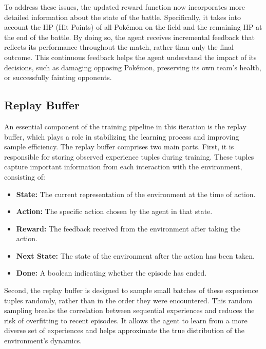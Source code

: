 To address these issues, the updated reward function now incorporates more detailed information about the 
state of the battle. Specifically, it takes into account the HP (Hit Points) of all Pokémon on the field 
and the remaining HP at the end of the battle. By doing so, the agent receives incremental feedback that 
reflects its performance throughout the match, rather than only the final outcome. This continuous feedback 
helps the agent understand the impact of its decisions, such as damaging opposing Pokémon, preserving its own 
team's health, or successfully fainting opponents.

\subsection{Replay Buffer} %
An essential component of the training pipeline in this iteration is the replay buffer, which plays 
a role in stabilizing the learning process and improving sample efficiency. The replay buffer 
comprises two main parts. First, it is responsible for storing observed experience tuples during training. 
These tuples capture important information from each interaction with the environment, consisting of:

\begin{itemize}
    \item \textbf{State:} The current representation of the environment at the time of action.
    \item \textbf{Action:} The specific action chosen by the agent in that state.
    \item \textbf{Reward:} The feedback received from the environment after taking the action.
    \item \textbf{Next State:} The state of the environment after the action has been taken.
    \item \textbf{Done:} A boolean indicating whether the episode has ended.
\end{itemize}

Second, the replay buffer is designed to sample small batches of these experience tuples randomly, 
rather than in the order they were encountered. This random sampling breaks the correlation between 
sequential experiences and reduces the risk of overfitting to recent episodes. It allows the agent 
to learn from a more diverse set of experiences and helps approximate the true distribution of 
the environment's dynamics. 
